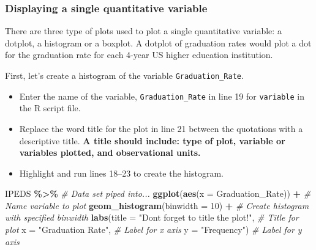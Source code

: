 \documentclass[
]{report}
\newenvironment{Shaded}{\begin{snugshade}}{\end{snugshade}}
\newcommand{\AttributeTok}[1]{\textcolor[rgb]{0.13,0.29,0.53}{#1}}
\newcommand{\CommentTok}[1]{\textcolor[rgb]{0.56,0.35,0.01}{\textit{#1}}}
\newcommand{\DecValTok}[1]{\textcolor[rgb]{0.00,0.00,0.81}{#1}}
\newcommand{\FunctionTok}[1]{\textcolor[rgb]{0.13,0.29,0.53}{\textbf{#1}}}
\newcommand{\NormalTok}[1]{#1}
\newcommand{\SpecialCharTok}[1]{\textcolor[rgb]{0.81,0.36,0.00}{\textbf{#1}}}
\newcommand{\StringTok}[1]{\textcolor[rgb]{0.31,0.60,0.02}{#1}}
\begin{document}
\vspace{0.8in}

\subsubsection*{Displaying a single quantitative variable}\label{displaying-a-single-quantitative-variable}

There are three type of plots used to plot a single quantitative variable: a dotplot, a histogram or a boxplot. A dotplot of graduation rates would plot a dot for the graduation rate for each 4-year US higher education institution.

First, let's create a histogram of the variable \texttt{Graduation\_Rate}.

\begin{itemize}
\item
  Enter the name of the variable, \texttt{Graduation\_Rate} in line 19 for \texttt{variable} in the R script file.
\item
  Replace the word title for the plot in line 21 between the quotations with a descriptive title. \textbf{A title should include: type of plot, variable or variables plotted, and observational units.}
\item
  Highlight and run lines 18--23 to create the histogram.
\end{itemize}

\begin{Shaded}
\begin{Highlighting}[]
\NormalTok{IPEDS }\SpecialCharTok{\%\textgreater{}\%} \CommentTok{\# Data set piped into...}
\FunctionTok{ggplot}\NormalTok{(}\FunctionTok{aes}\NormalTok{(}\AttributeTok{x =}\NormalTok{ Graduation\_Rate)) }\SpecialCharTok{+}   \CommentTok{\# Name variable to plot}
  \FunctionTok{geom\_histogram}\NormalTok{(}\AttributeTok{binwidth =} \DecValTok{10}\NormalTok{) }\SpecialCharTok{+}  \CommentTok{\# Create histogram with specified binwidth}
  \FunctionTok{labs}\NormalTok{(}\AttributeTok{title =} \StringTok{"Don\textquotesingle{}t forget to title the plot!"}\NormalTok{, }\CommentTok{\# Title for plot}
       \AttributeTok{x =} \StringTok{"Graduation Rate"}\NormalTok{, }\CommentTok{\# Label for x axis}
       \AttributeTok{y =} \StringTok{"Frequency"}\NormalTok{) }\CommentTok{\# Label for y axis}
\end{Highlighting}
\end{Shaded}
\end{document}
